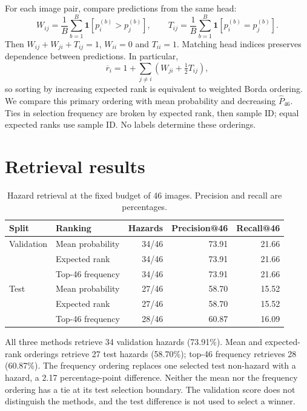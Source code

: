 \documentclass[10pt,a4paper]{article}
\newcommand{\ind}{\mathbf{1}}
\begin{document}
For each image pair, compare predictions from the same head:
\begin{equation}
W_{ij}=\frac{1}{B}\sum_{b=1}^{B}\ind\!\left[p_i^{(b)}>p_j^{(b)}\right],\qquad
T_{ij}=\frac{1}{B}\sum_{b=1}^{B}\ind\!\left[p_i^{(b)}=p_j^{(b)}\right].
\end{equation}
Then $W_{ij}+W_{ji}+T_{ij}=1$, $W_{ii}=0$ and $T_{ii}=1$. Matching head indices
preserves dependence between predictions. In particular,
\begin{equation}
\overline{r}_i=1+\sum_{j\ne i}\left(W_{ji}+\tfrac12 T_{ij}\right),
\end{equation}
so sorting by increasing expected rank is equivalent to weighted Borda ordering.
We compare this primary ordering with mean probability and decreasing
$\widehat{P}_{46}$. Ties in selection frequency are broken by expected rank, then
sample ID; equal expected ranks use sample ID. No labels determine these orderings.

\section{Retrieval results}
\begin{table}[H]
\centering
\caption{Hazard retrieval at the fixed budget of 46 images. Precision and recall are percentages.}
\label{tab:ranks}
\small
\begin{tabular}{llrrr}
\toprule
Split & Ranking & Hazards & Precision@46 & Recall@46 \\
\midrule
Validation & Mean probability & 34/46 & 73.91 & 21.66 \\
 & Expected rank & 34/46 & 73.91 & 21.66 \\
 & Top-46 frequency & 34/46 & 73.91 & 21.66 \\
\midrule
Test & Mean probability & 27/46 & 58.70 & 15.52 \\
 & Expected rank & 27/46 & 58.70 & 15.52 \\
 & Top-46 frequency & 28/46 & 60.87 & 16.09 \\
\bottomrule
\end{tabular}
\end{table}

All three methods retrieve 34 validation hazards (73.91\%). Mean and expected-rank
orderings retrieve 27 test hazards (58.70\%); top-46 frequency retrieves 28
(60.87\%). The frequency ordering replaces one selected test non-hazard with a
hazard, a 2.17 percentage-point difference. Neither the mean nor the frequency
ordering has a tie at its test selection boundary. The validation score does not
distinguish the methods, and the test difference is not used to select a winner.
\end{document}

